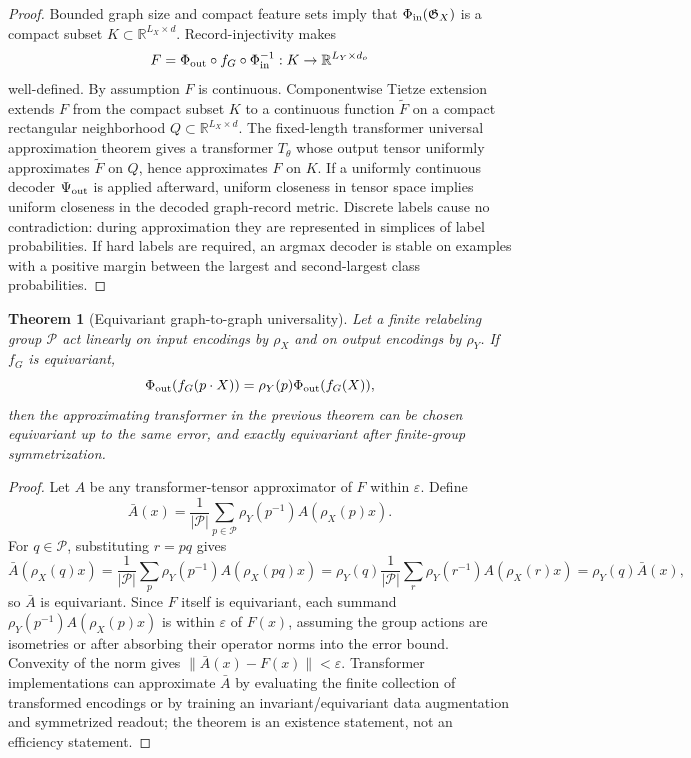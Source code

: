 \documentclass[11pt]{article}
\newtheorem{theorem}[definition]{Theorem}
\newcommand{\R}{\mathbb{R}}
\newcommand{\1}{\mathbf{1}}
\newcommand{\eps}{\varepsilon}
\begin{document}
\begin{proof}
Bounded graph size and compact feature sets imply that \(\Phi_{\rm in}(\mathfrak G_X)\) is a compact subset \(K\subset\R^{L_X\times d}\). Record-injectivity makes
\[
  F=\Phi_{\rm out}\circ f_G\circ\Phi_{\rm in}^{-1}:K\to\R^{L_Y\times d_o}
\]
well-defined. By assumption \(F\) is continuous. Componentwise Tietze extension extends \(F\) from the compact subset \(K\) to a continuous function \(\widetilde F\) on a compact rectangular neighborhood \(Q\subset\R^{L_X\times d}\). The fixed-length transformer universal approximation theorem gives a transformer \(T_\theta\) whose output tensor uniformly approximates \(\widetilde F\) on \(Q\), hence approximates \(F\) on \(K\). If a uniformly continuous decoder \(\Psi_{\rm out}\) is applied afterward, uniform closeness in tensor space implies uniform closeness in the decoded graph-record metric. Discrete labels cause no contradiction: during approximation they are represented in simplices of label probabilities. If hard labels are required, an argmax decoder is stable on examples with a positive margin between the largest and second-largest class probabilities.
\end{proof}

\begin{theorem}[Equivariant graph-to-graph universality]
Let a finite relabeling group \(\mathcal P\) act linearly on input encodings by \(\rho_X\) and on output encodings by \(\rho_Y\). If \(f_G\) is equivariant,
\[
  \Phi_{\rm out}(f_G(p\cdot X))=\rho_Y(p)\Phi_{\rm out}(f_G(X)),
\]
then the approximating transformer in the previous theorem can be chosen equivariant up to the same error, and exactly equivariant after finite-group symmetrization.
\end{theorem}

\begin{proof}
Let \(A\) be any transformer-tensor approximator of \(F\) within \(\eps\). Define
\[
  \bar A(x)=\frac{1}{|\mathcal P|}\sum_{p\in\mathcal P}\rho_Y(p^{-1})A(\rho_X(p)x).
\]
For \(q\in\mathcal P\), substituting \(r=pq\) gives
\[
\bar A(\rho_X(q)x)
=\frac{1}{|\mathcal P|}\sum_p \rho_Y(p^{-1})A(\rho_X(pq)x)
=\rho_Y(q)\frac{1}{|\mathcal P|}\sum_r \rho_Y(r^{-1})A(\rho_X(r)x)
=\rho_Y(q)\bar A(x),
\]
so \(\bar A\) is equivariant. Since \(F\) itself is equivariant, each summand \(\rho_Y(p^{-1})A(\rho_X(p)x)\) is within \(\eps\) of \(F(x)\), assuming the group actions are isometries or after absorbing their operator norms into the error bound. Convexity of the norm gives \(\|\bar A(x)-F(x)\|<\eps\). Transformer implementations can approximate \(\bar A\) by evaluating the finite collection of transformed encodings or by training an invariant/equivariant data augmentation and symmetrized readout; the theorem is an existence statement, not an efficiency statement.
\end{proof}
\end{document}
